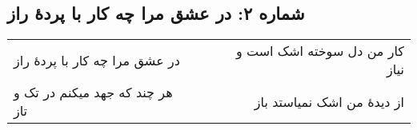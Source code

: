 \begin{center}
\section*{شماره ۲: در عشق مرا چه کار با پردۀ راز}
\label{sec:002}
\begin{longtable}{l p{0.5cm} r}
در عشق مرا چه کار با پردهٔ راز
&&
کار من دل سوخته اشک است و نیاز
\\
هر چند که جهد میکنم در تک و تاز
&&
از دیدهٔ من اشک نمیاستد باز
\\
\end{longtable}
\end{center}
